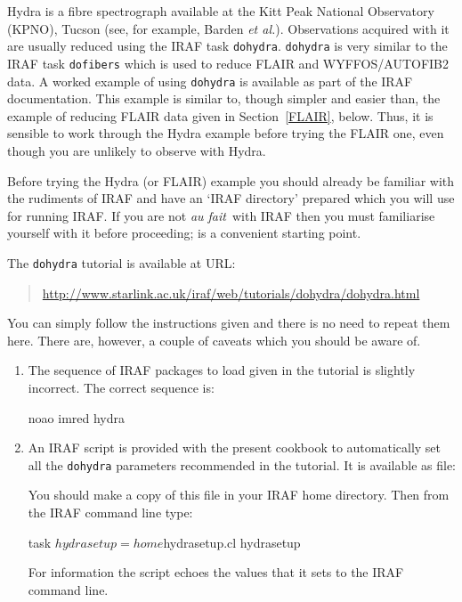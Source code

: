 \documentclass[twoside,11pt]{starlink}
\begin{document}
Hydra is a fibre spectrograph available at the Kitt Peak National
Observatory (KPNO), Tucson (see, for example, Barden \textit{et
al.}\/\cite{BARDEN93}).  Observations acquired with it are usually
reduced using the IRAF task \texttt{dohydra}.  \texttt{dohydra} is very
similar to the IRAF task \texttt{dofibers} which is used to reduce
FLAIR and WYFFOS/AUTOFIB2 data.  A worked example of using \texttt{dohydra} is available as part of the IRAF documentation.  This example
is similar to, though simpler and easier than, the example of reducing
FLAIR data given in Section~\ref{FLAIR}, below.  Thus, it is sensible to
work through the Hydra example before trying the FLAIR one, even though
you are unlikely to observe with Hydra.

Before trying the Hydra (or FLAIR) example you should already be familiar
with the rudiments of IRAF and have an `IRAF directory' prepared which
you will use for running IRAF.  If you are not \textit{au fait}\, with
IRAF then you must familiarise yourself with it before proceeding;
\/\cite{SG12}
is a convenient starting point.

The \texttt{dohydra} tutorial is available at URL:

\begin{quote}
\url{http://www.starlink.ac.uk/iraf/web/tutorials/dohydra/dohydra.html}
\end{quote}

You can simply follow the instructions given and there is no need to
repeat them here.  There are, however, a couple of caveats which
you should be aware of.

\begin{enumerate}

  \item The sequence of IRAF packages to load given in the tutorial
   is slightly incorrect.  The correct sequence is:

\begin{terminalv}
noao
imred
hydra
\end{terminalv}

  \item An IRAF script is provided with the present cookbook to
   automatically set all the \texttt{dohydra} parameters recommended in
   the tutorial.  It is available as file:

\begin{terminalv}
/star/examples/sc14/hydra/hydrasetup.cl}
\end{terminalv}

   You should make a copy of this file in your IRAF home directory.
   Then from the IRAF command line type:

\begin{terminalv}
task  $hydrasetup=home$hydrasetup.cl
hydrasetup
\end{terminalv}

   For information the script echoes the values that it sets to the
   IRAF command line.

\end{enumerate}
\end{document}
